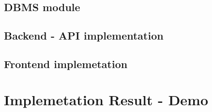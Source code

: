 \subsection{DBMS module}

\subsection{Backend - API implementation}

\subsection{Frontend implemetation}

\section{Implemetation Result - Demo}